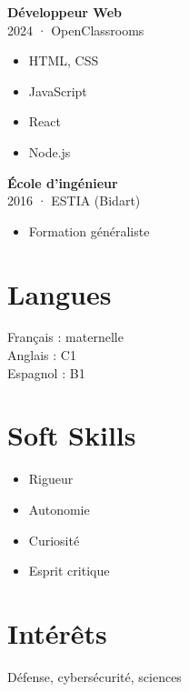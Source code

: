 \documentclass[a4paper,12pt]{article}
\begin{document}
\begin{paracol}{2}
\begin{leftcolumn}
\begin{minipage}[t][\dimexpr\textheight - 9em\relax][t]{\dimexpr\linewidth}
{    \textbf{Développeur Web}\\
    \footnotesize 2024 · OpenClassrooms
    \begin{itemize}[leftmargin=1em, nosep]
      \item HTML, CSS
      \item JavaScript
      \item React
      \item Node.js\\
    \end{itemize}

    \textbf{École d'ingénieur}\\
    \footnotesize 2016 · ESTIA (Bidart)
    \begin{itemize}[leftmargin=1em, nosep]
      \item Formation généraliste
    \end{itemize}

    \vspace{1em}
    \section*{Langues}
    Français : maternelle\\
    Anglais : C1\\
    Espagnol : B1

    \vspace{1em}
    \section*{Soft Skills}
    \begin{itemize}[leftmargin=1em, nosep]
      \item Rigueur
      \item Autonomie
      \item Curiosité
      \item Esprit critique
    \end{itemize}

    \vspace{1em}
    \section*{Intérêts}
    Défense, cybersécurité, sciences

    } %
  \end{minipage}
\end{leftcolumn}

\begin{rightcolumn}
\begin{minipage}[t][\dimexpr\textheight - 9em\relax][t]{\dimexpr\linewidth - 1.5em\relax}
  \hspace*{1em}
  \parbox{\dimexpr\linewidth - 1.5em\relax}{

}
\end{minipage}
\end{rightcolumn}
\end{paracol}
\end{document}
